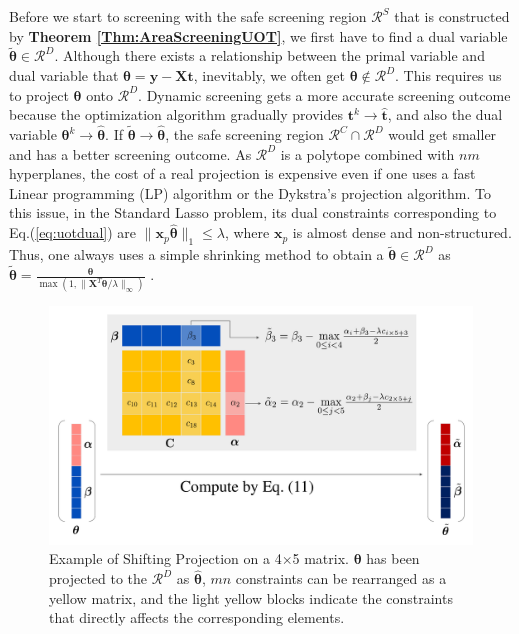 \documentclass[twoside]{article}
\theoremstyle{plain}
\newcommand{\mat}[1]{\mathbf{#1}}
\renewcommand{\vec}[1]{\bm{#1}}
\begin{document}
Before we start to screening with the safe screening region $\mathcal{R}^S$ that is constructed by {\bf Theorem \ref{Thm:AreaScreeningUOT}}, we first have to find a dual variable $\tilde{\vec{\theta}}\in\mathcal{R}^{D}$. Although there exists a relationship between the primal variable and dual variable that $\vec{\theta} = \vec{y} - \mat{X}\vec{t}$, inevitably, we often get $\vec{\theta} \notin \mathcal{R}^{D}$. This requires us to project $\vec{\theta}$ onto $\mathcal{R}^{D}$. Dynamic screening gets a more accurate screening outcome because the optimization algorithm gradually provides $\vec t^{k} \rightarrow \hat{\vec t}$, and also the dual variable $\vec \theta^{k} \rightarrow \hat{\vec \theta}$. If $\vec{ \tilde{\theta}}\rightarrow \hat{\vec \theta}$, the safe screening region $\mathcal{R}^{C}\cap\mathcal{R}^{D}$ would get smaller and has a better screening outcome. As $\mathcal{R}^{D}$ is a polytope combined with $nm$ hyperplanes, the cost of a real projection is expensive even if one uses a fast Linear programming (LP) algorithm or the Dykstra's projection algorithm. To this issue, in the Standard Lasso problem, its dual constraints corresponding to {Eq.(\ref{eq:uotdual})} are $\|\vec{x}_p \hat{\vec{\theta}}\|_1\leq \lambda$, where $\vec{x}_p$ is almost dense and non-structured. Thus, one always uses a simple shrinking method to obtain a $\tilde{\vec{\theta}} \in \mathcal{R}^{D}$ as 
$
\tilde{\vec{\theta}} = \frac{\vec\theta}{\max(1, \|{\mat{X}^T\vec\theta}/{\lambda}\|_{\infty})}
$ {\citep[Proposition 11]{JMLR:v18:16-577} \citep[Theorem 11]{Yamada_NIPS_2021}}. 

\begin{figure}[t]
\centering
\includegraphics[width = \linewidth]{pic/matrix}
\caption{Example of Shifting Projection on a 4$\times$5 matrix. $\vec \theta$ has been projected to the $\mathcal{R}^{D}$ as $\vec{\hat{\theta}}$, $mn$ constraints can be rearranged as a yellow matrix, and the light yellow blocks indicate the constraints that directly affects the corresponding elements.}
\label{Fig:structure}
\end{figure}
\end{document}
